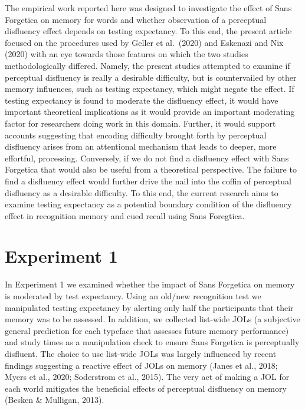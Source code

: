 \documentclass[
  english,
  jou]{apa7}
\begin{document}
The empirical work reported here was designed to investigate the effect of Sans Forgetica on memory for words and whether observation of a perceptual disfluency effect depends on testing expectancy. To this end, the present article focused on the procedures used by Geller et al.~(2020) and Eskenazi and Nix (2020) with an eye towards those features on which the two studies methodologically differed. Namely, the present studies attempted to examine if perceptual disfluency is really a desirable difficulty, but is countervailed by other memory influences, such as testing expectancy, which might negate the effect. If testing expectancy is found to moderate the disfluency effect, it would have important theoretical implications as it would provide an important moderating factor for researchers doing work in this domain. Further, it would support accounts suggesting that encoding difficulty brought forth by perceptual disfluency arises from an attentional mechanism that leads to deeper, more effortful, processing. Conversely, if we do not find a disfluency effect with Sans Forgetica that would also be useful from a theoretical perspective. The failure to find a disfluency effect would further drive the nail into the coffin of perceptual disfluency as a desirable difficulty. To this end, the current research aims to examine testing expectancy as a potential boundary condition of the disfluency effect in recognition memory and cued recall using Sans Foregtica.

\hypertarget{experiment-1}{%
\section{Experiment 1}\label{experiment-1}}

In Experiment 1 we examined whether the impact of Sans Forgetica on memory is moderated by test expectancy. Using an old/new recognition test we manipulated testing expectancy by alerting only half the participants that their memory was to be assessed. In addition, we collected list-wide JOLs (a subjective general prediction for each typeface that assesses future memory performance) and study times as a manipulation check to ensure Sans Forgetica is perceptually disfluent. The choice to use list-wide JOLs was largely influenced by recent findings suggesting a reactive effect of JOLs on memory (Janes et al., 2018; Myers et al., 2020; Soderstrom et al., 2015). The very act of making a JOL for each world mitigates the beneficial effects of perceptual disfluency on memory (Besken \& Mulligan, 2013).
\end{document}

